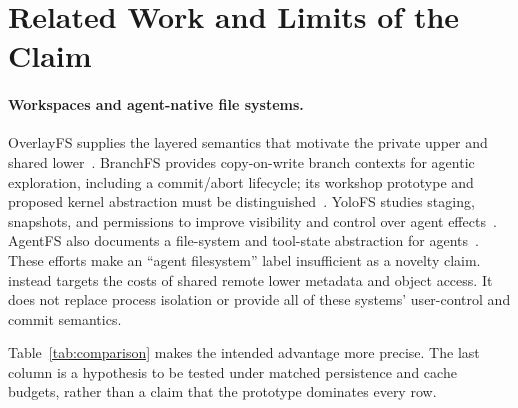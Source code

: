 \section{Related Work and Limits of the Claim}
\label{sec:related}

\paragraph{Workspaces and agent-native file systems.}
OverlayFS supplies the layered semantics that motivate the private upper
and shared lower~\cite{overlayfs}. BranchFS provides copy-on-write branch
contexts for agentic exploration, including a commit/abort lifecycle; its
workshop prototype and proposed kernel abstraction must be
distinguished~\cite{branchfs2026}. YoloFS studies staging, snapshots, and
permissions to improve visibility and control over agent
effects~\cite{yolofs2026}. AgentFS also documents a file-system and tool-state
abstraction for agents~\cite{agentfs2025}. These efforts make an
``agent filesystem'' label insufficient as a novelty claim. \sys instead
targets the costs of shared remote lower metadata and object access. It does
not replace process isolation or provide all of these systems' user-control
and commit semantics.

Table~\ref{tab:comparison} makes the intended advantage more precise. The
last column is a hypothesis to be tested under matched persistence and cache
budgets, rather than a claim that the prototype dominates every row.

